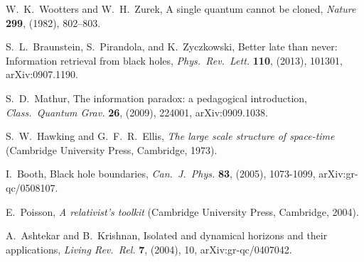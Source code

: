 \documentclass[11pt]{article}
\begin{document}
\begin{thebibliography}{999}
 W.~K.\ Wootters and W.~H.\ Zurek, A single 
quantum cannot be cloned, \emph{Nature} {\bf 299}, (1982), 
802--803.

  S.~L.\ Braunstein, S.\ Pirandola, and K.\ Zyczkowski,
Better late than never: Information retrieval from black holes,
\emph{Phys.\ Rev.\ Lett.} {\bf 110},  (2013), 101301,
arXiv:0907.1190.

 S.~D.\ Mathur, The information paradox: 
a pedagogical introduction, \emph{Class.\ Quantum Grav.} {\bf 26},
(2009),  224001, arXiv:0909.1038.

  S.~W.\ Hawking and G.~F.~R.\ Ellis,
\emph{The large scale structure of space-time} (Cambridge
University Press, Cambridge, 1973).

 I.\ Booth, Black hole boundaries, \emph{Can.\
J.\ Phys.} {\bf 83}, (2005), 1073-1099, arXiv:gr-qc/0508107.

 E.\ Poisson, \emph{A relativist's toolkit} (Cambridge
University Press, Cambridge, 2004).

 A.\ Ashtekar and B.\ Krishnan, Isolated and 
dynamical horizons and their applications, \emph{Living Rev.\ Rel.}
{\bf 7}, (2004), 10, arXiv:gr-qc/0407042.

\end{thebibliography}
 
\end{document}
